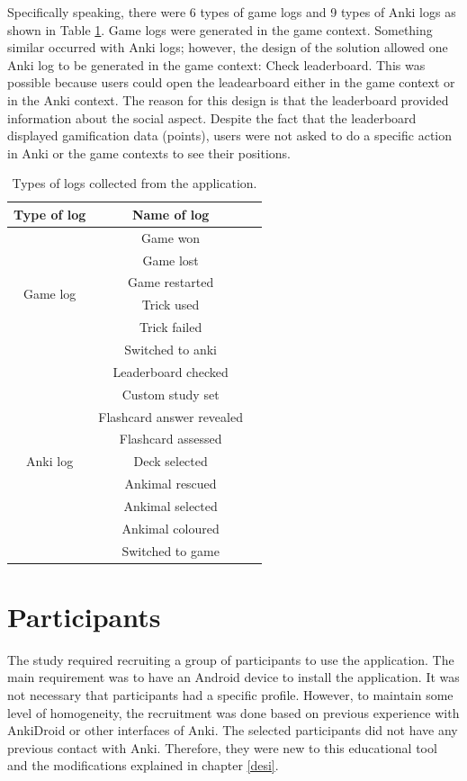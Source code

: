 Specifically speaking, there were 6 types of game logs and 9 types of Anki logs as shown in Table \ref{tab:log-types}. Game logs were generated in the game context. Something similar occurred with Anki logs; however, the design of the solution allowed one Anki log to be generated in the game context: Check leaderboard. This was possible because users could open the leadearboard either in the game context or in the Anki context. The reason for this design is that the leaderboard provided information about the social aspect. Despite the fact that the leaderboard displayed gamification data (points), users were not asked to do a specific action in Anki or the game contexts to see their positions.

\begin{table}[!htb]
    \centering
    {\renewcommand{\arraystretch}{2}
        \begin{tabular}{ |c|c|c| }
            \hline
            \textbf{Type of log} & \textbf{Name of log} \\
            \hline
            \multirow{6}{3cm}{Game log} &  Game won\\
            & Game lost \\
            & Game restarted \\
            & Trick used \\
            & Trick failed \\
            & Switched to anki \\
            \hline
            \multirow{9}{3cm}{Anki log} &  Leaderboard checked\\
            & Custom study set \\
            & Flashcard answer revealed\\
            & Flashcard assessed \\
            & Deck selected \\
            & Ankimal rescued\\
            & Ankimal selected\\
            & Ankimal coloured\\
            & Switched to game \\
            \hline
        \end{tabular}
    }
    \caption{Types of logs collected from the application.}
    \label{tab:log-types}
\end{table}

\section{Participants}
\label{participants}
The study required recruiting a group of participants to use the application. The main requirement was to have an Android device to install the application. It was not necessary that participants had a specific profile. However, to maintain some level of homogeneity, the recruitment was done based on previous experience with AnkiDroid or other interfaces of Anki. The selected participants did not have any previous contact with Anki. Therefore, they were new to this educational tool and the modifications explained in chapter \ref{desi}.

